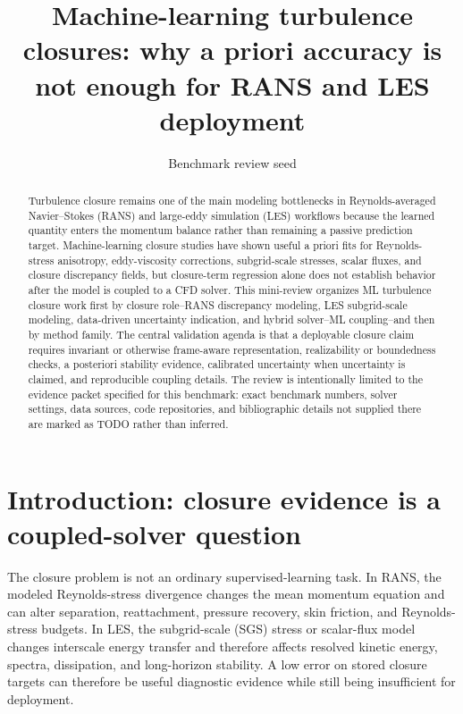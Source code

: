 \documentclass[11pt]{article}
\title{Machine-learning turbulence closures: why a priori accuracy is not enough for RANS and LES deployment}
\author{Benchmark review seed}
\date{}
\begin{document}
\maketitle

\begin{abstract}
Turbulence closure remains one of the main modeling bottlenecks in Reynolds-averaged Navier--Stokes (RANS) and large-eddy simulation (LES) workflows because the learned quantity enters the momentum balance rather than remaining a passive prediction target. Machine-learning closure studies have shown useful a priori fits for Reynolds-stress anisotropy, eddy-viscosity corrections, subgrid-scale stresses, scalar fluxes, and closure discrepancy fields, but closure-term regression alone does not establish behavior after the model is coupled to a CFD solver. This mini-review organizes ML turbulence closure work first by closure role--RANS discrepancy modeling, LES subgrid-scale modeling, data-driven uncertainty indication, and hybrid solver--ML coupling--and then by method family. The central validation agenda is that a deployable closure claim requires invariant or otherwise frame-aware representation, realizability or boundedness checks, a posteriori stability evidence, calibrated uncertainty when uncertainty is claimed, and reproducible coupling details. The review is intentionally limited to the evidence packet specified for this benchmark: exact benchmark numbers, solver settings, data sources, code repositories, and bibliographic details not supplied there are marked as TODO rather than inferred.
\end{abstract}

\section{Introduction: closure evidence is a coupled-solver question}

The closure problem is not an ordinary supervised-learning task. In RANS, the modeled Reynolds-stress divergence changes the mean momentum equation and can alter separation, reattachment, pressure recovery, skin friction, and Reynolds-stress budgets. In LES, the subgrid-scale (SGS) stress or scalar-flux model changes interscale energy transfer and therefore affects resolved kinetic energy, spectra, dissipation, and long-horizon stability. A low error on stored closure targets can therefore be useful diagnostic evidence while still being insufficient for deployment.
\end{document}
